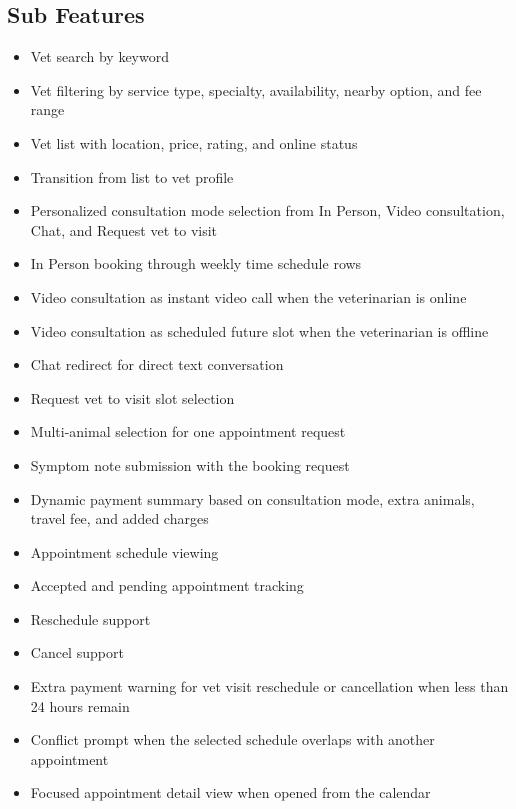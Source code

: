 \documentclass[12pt]{article}
\begin{document}
\subsection{Sub Features}
\begin{itemize}
    \item Vet search by keyword
    \item Vet filtering by service type, specialty, availability, nearby option, and fee range
    \item Vet list with location, price, rating, and online status
    \item Transition from list to vet profile
    \item Personalized consultation mode selection from In Person, Video consultation, Chat, and Request vet to visit
    \item In Person booking through weekly time schedule rows
    \item Video consultation as instant video call when the veterinarian is online
    \item Video consultation as scheduled future slot when the veterinarian is offline
    \item Chat redirect for direct text conversation
    \item Request vet to visit slot selection
    \item Multi-animal selection for one appointment request
    \item Symptom note submission with the booking request
    \item Dynamic payment summary based on consultation mode, extra animals, travel fee, and added charges
    \item Appointment schedule viewing
    \item Accepted and pending appointment tracking
    \item Reschedule support
    \item Cancel support
    \item Extra payment warning for vet visit reschedule or cancellation when less than 24 hours remain
    \item Conflict prompt when the selected schedule overlaps with another appointment
    \item Focused appointment detail view when opened from the calendar
\end{itemize}
\end{document}
